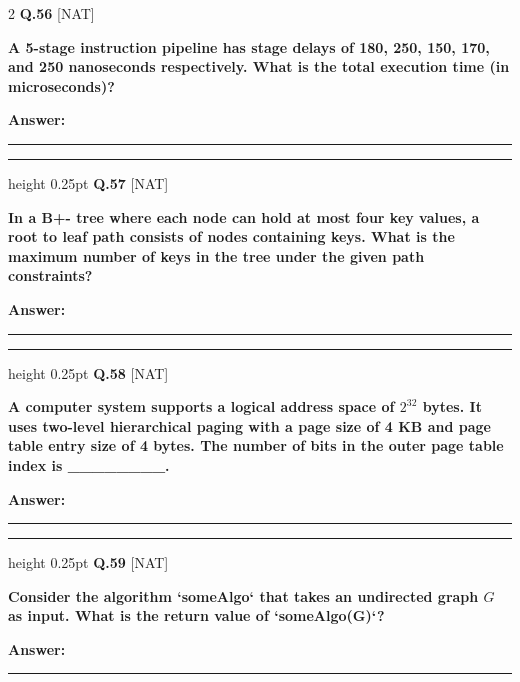 \documentclass[a4paper,10pt,twoside]{article}
\begin{document}
\begin{multicols}{2}
\noindent\textbf{Q.56} \hfill {\footnotesize\textsf{[NAT]}}
\par\vspace{2pt}
{\bfseries A 5-stage instruction pipeline has stage delays of 180, 250, 150, 170, and 250 nanoseconds respectively. What is the total execution time (in microseconds)? \par}
\par\vspace{3pt}\noindent\textbf{Answer:} \rule{3.2cm}{0.4pt}
\par\vspace{6pt}\hrule height 0.25pt\vspace{6pt}
\noindent\textbf{Q.57} \hfill {\footnotesize\textsf{[NAT]}}
\par\vspace{2pt}
{\bfseries In a B+- tree where each node can hold at most four key values, a root to leaf path consists of nodes containing keys. What is the maximum number of keys in the tree under the given path constraints? \par}
\par\vspace{3pt}\noindent\textbf{Answer:} \rule{3.2cm}{0.4pt}
\par\vspace{6pt}\hrule height 0.25pt\vspace{6pt}
\noindent\textbf{Q.58} \hfill {\footnotesize\textsf{[NAT]}}
\par\vspace{2pt}
{\bfseries A computer system supports a logical address space of $2^{32}$ bytes. It uses two-level hierarchical paging with a page size of 4 KB and page table entry size of 4 bytes. The number of bits in the outer page table index is \_\_\_\_\_\_\_\_. \par}
\par\vspace{3pt}\noindent\textbf{Answer:} \rule{3.2cm}{0.4pt}
\par\vspace{6pt}\hrule height 0.25pt\vspace{6pt}
\noindent\textbf{Q.59} \hfill {\footnotesize\textsf{[NAT]}}
\par\vspace{2pt}
{\bfseries Consider the algorithm `someAlgo` that takes an undirected graph $G$ as input. What is the return value of `someAlgo(G)`? \par}
\par\vspace{3pt}\noindent\textbf{Answer:} \rule{3.2cm}{0.4pt}

\end{multicols}
\end{document}
